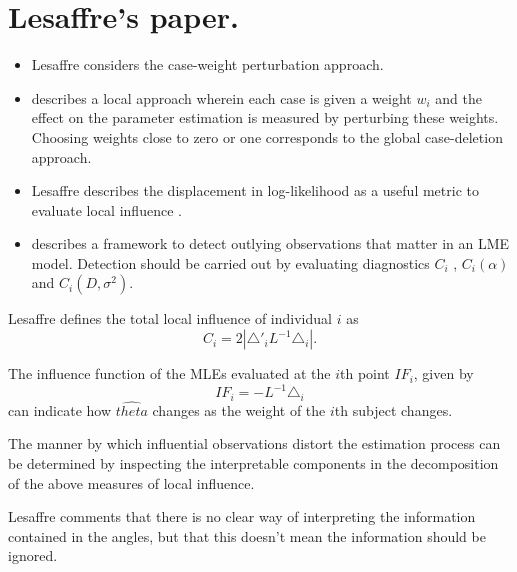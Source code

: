 \documentclass[Main.tex]{subfiles}
\begin{document}
	\newpage
\section{Lesaffre's paper.} %

\begin{itemize}
\item Lesaffre considers the case-weight perturbation approach.




\item \citep{cook86} describes a local approach wherein each case is given a weight $w_{i}$ and the effect on the parameter estimation is measured by perturbing these weights. Choosing weights close to zero or one corresponds to the global case-deletion approach.


\item Lesaffre  describes the displacement in log-likelihood as a useful metric to evaluate local influence \citep{cook86}.




\item \citet{lesaffre} describes a framework to detect outlying observations that matter in an LME model. Detection should be carried out by evaluating diagnostics $C_{i}$ , $C_{i}(\alpha)$ and $C_{i}(D,\sigma^2)$.
\end{itemize}






Lesaffre defines the total local influence of individual $i$ as
\begin{equation}
C_{i} = 2 | \triangle \prime _{i} L^{-1} \triangle_{i}|.
\end{equation}




The influence function of the MLEs evaluated at the $i$th point $IF_{i}$, given by
\begin{equation}
IF_{i} = -L^{-1}\triangle _{i}
\end{equation}
can indicate how $\hat{theta}$ changes as the weight of the $i$th
subject changes.


The manner by which influential observations distort the estimation process can be determined by inspecting the
interpretable components in the decomposition of the above measures of local influence.




Lesaffre comments that there is no clear way of interpreting the information contained in the angles, but that this doesn't mean the information should be ignored.
\end{document}

